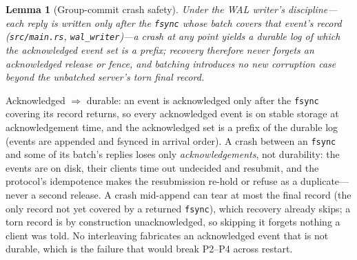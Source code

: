 \documentclass[10pt,journal,compsoc]{IEEEtran}
\newtheorem{lemma}{Lemma}
\begin{document}
\begin{lemma}[Group-commit crash safety]
\label{lem:gc}
Under the WAL writer's discipline---each reply is written only after the
\texttt{fsync} whose batch covers that event's record
(\texttt{src/main.rs}, \texttt{wal\_writer})---a crash at any point yields
a durable log of which the acknowledged event set is a prefix; recovery
therefore never forgets an acknowledged release or fence, and batching
introduces no new corruption case beyond the unbatched server's torn final
record.
\end{lemma}
\begin{IEEEproof}
Acknowledged $\Rightarrow$ durable: an event is acknowledged only after the
\texttt{fsync} covering its record returns, so every acknowledged event is
on stable storage at acknowledgement time, and the acknowledged set is a
prefix of the durable log (events are appended and fsynced in arrival
order). A crash between an \texttt{fsync} and some of its batch's replies
loses only \emph{acknowledgements}, not durability: the events are on disk,
their clients time out undecided and resubmit, and the protocol's
idempotence makes the resubmission re-hold or refuse as a
duplicate---never a second release. A crash mid-append can tear at most
the final record (the only record not yet covered by a returned
\texttt{fsync}), which recovery already skips; a torn record is by
construction unacknowledged, so skipping it forgets nothing a client was
told. No interleaving fabricates an acknowledged event that is not
durable, which is the failure that would break P2--P4 across restart.
\end{IEEEproof}
\end{document}
